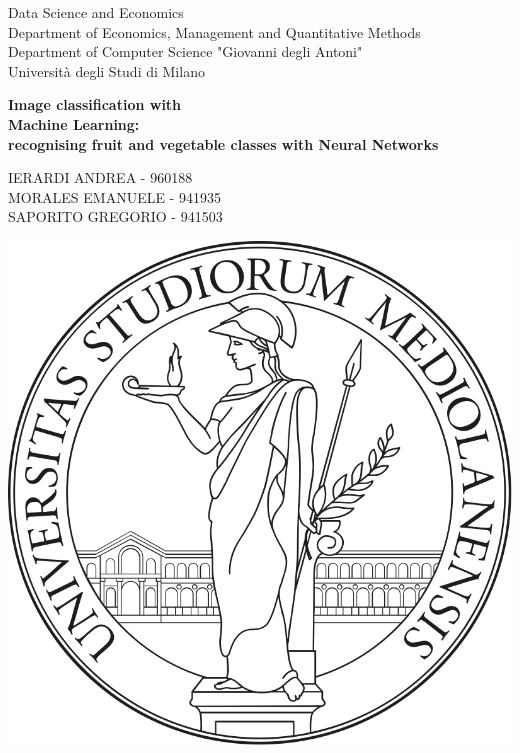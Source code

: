 \documentclass[10pt,english, openany]{book}
\begin{document}

\begin{titlepage}
	\clearpage\thispagestyle{empty}
	\centering
	\vspace{1cm}

	{\normalsize Data Science and Economics \\ 
    Department of Economics, Management and Quantitative Methods\\
    Department of Computer Science "Giovanni degli Antoni"\\
		Università degli Studi di Milano\par}
		\vspace{3cm}
	{\Huge \textbf{Image classification with \\  Machine Learning: 	\vspace{0.5cm}
 }} \\
	{\large \textbf{recognising fruit and vegetable classes with Neural Networks}} \\
	\vspace{3cm}
	{\normalsize IERARDI ANDREA - 960188 \\ 	\vspace{0.5cm} %
	             MORALES EMANUELE - 941935 \\	\vspace{0.5cm}
	             SAPORITO GREGORIO - 941503 \par}
	\vspace{3cm}
    
    \centering \includegraphics[scale=0.14]{logo.png}
    

\end{titlepage}
\end{document}
